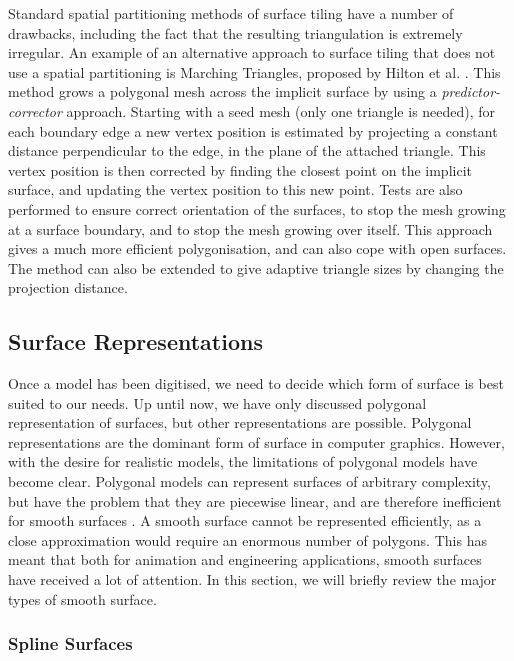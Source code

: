 \documentclass[10pt,oneside,fleqn,a4paper]{book}
\begin{document}
Standard spatial partitioning methods of surface tiling have a number of drawbacks, including the fact that the resulting triangulation is extremely irregular. An example of an alternative approach to surface tiling that does not use a spatial partitioning is Marching Triangles, proposed by Hilton et al. \cite{Hilton96a}. This method grows a polygonal mesh across the implicit surface by using a {\it predictor-corrector} approach. Starting with a seed mesh (only one triangle is needed), for each boundary edge a new vertex position is estimated by projecting a constant distance perpendicular to the edge, in the plane of the attached triangle. This vertex position is then corrected by finding the closest point on the implicit surface, and updating the vertex position to this new point. Tests are also performed to ensure correct orientation of the surfaces, to stop the mesh growing at a surface boundary, and to stop the mesh growing over itself. This approach gives a much more efficient polygonisation, and can also cope with open surfaces. The method can also be extended to give adaptive triangle sizes by changing the projection distance.

\subsection{\label{sec:reviewsurfaces}Surface Representations}

Once a model has been digitised, we need to decide which form of surface is best suited to our needs. Up until now, we have only discussed polygonal representation of surfaces, but other representations are possible. Polygonal representations are the dominant form of surface in computer graphics. However, with the desire for realistic models, the limitations of polygonal models have become clear. Polygonal models can represent surfaces of arbitrary complexity, but have the problem that they are piecewise linear, and are therefore inefficient for smooth surfaces \cite{Besl94}. A smooth surface cannot be represented efficiently, as a close approximation would require an enormous number of polygons. This has meant that both for animation and engineering applications, smooth surfaces have received a lot of attention. In this section, we will briefly review the major types of smooth surface.

\subsubsection{Spline Surfaces}
\end{document}
